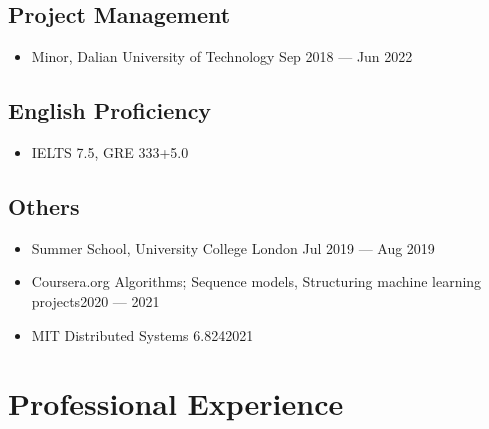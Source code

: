 \documentclass[a4,10pt]{article}
\newcommand{\subtext}[1]{
#1\par\vspace{-0.2cm}}
\newenvironment{zitemize}{
\begin{itemize}\itemsep0pt \parskip0pt \parsep1pt}
{\end{itemize}\vspace{-0.5cm}}
\begin{document}
\subsection*{Project Management}
\begin{zitemize}
    \item
        \subtext{Minor, Dalian University of Technology \hfill Sep 2018 --- Jun 2022}
        \vspace{0.1cm}
\end{zitemize}

\subsection*{English Proficiency}
\begin{zitemize}
    \item
    \subtext{IELTS 7.5, GRE 333+5.0}
\end{zitemize}

\subsection*{Others}
\begin{zitemize}
    \item
        \subtext{Summer School, University College London \hfill Jul 2019 --- Aug 2019}
        \vspace{0.1cm}
    \item
        \subtext{Coursera.org Algorithms; Sequence models, Structuring machine learning projects\hfill 2020 --- 2021 }
        \vspace{0.1cm}
    \item
        \subtext{MIT Distributed Systems 6.824\hfill2021}
        \vspace{0.1cm}
\end{zitemize}
\vspace{0.2cm}





\section{Professional Experience}

        
\end{document}
